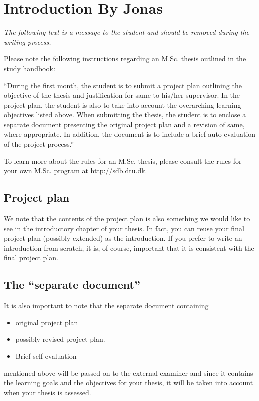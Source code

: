 \documentclass[../Thesis.tex]{subfiles}
\begin{document}
\chapter{Introduction By Jonas}

\textit{The following text is a message to the student and should be removed during the writing process.}

Please note the following instructions regarding an M.Sc. thesis outlined in the study handbook:

``During the first month, the student is to submit a project plan outlining the objective of the thesis and justification for same to his/her supervisor. In the project plan, the student is also to take into account the overarching learning objectives listed above. When submitting the thesis, the student is to enclose a separate document presenting the original project plan and a revision of same, where appropriate. In addition, the document is to include a brief auto-evaluation of the project process.''

To learn more about the rules for an M.Sc. thesis, please consult the rules for your own M.Sc. program at \url{http://sdb.dtu.dk}.

\section{Project plan}
We note that the contents of the project plan is also something we would like to see in the introductory chapter of your thesis. In fact, you can reuse your final project plan (possibly extended) as the introduction. If you prefer to write an introduction from scratch, it is, of course, important that it is consistent with the final project plan.

\section{The ``separate document''}
It is also important to note that the separate document containing
\begin{itemize}
    \item original project plan
    \item possibly revised project plan.
    \item Brief self-evaluation
\end{itemize}
mentioned above will be passed on to the external examiner and since it contains the learning goals and the objectives for your thesis, it will be taken into account when your thesis is assessed.
\end{document}
